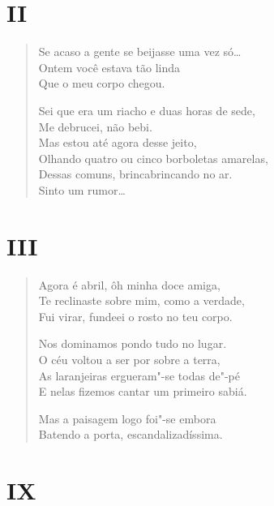 \pagebreak
{}
\section*{II}

\begin{verse}
Se acaso a gente se beijasse uma vez só\ldots{}\\
Ontem você estava tão linda\\
Que o meu corpo chegou.

Sei que era um riacho e duas horas de sede,\\
Me debrucei, não bebi.\\
Mas estou até agora desse jeito,\\
Olhando quatro ou cinco borboletas amarelas,\\
Dessas comuns, brincabrincando no ar.\\
Sinto um rumor\ldots{}
\end{verse}

\pagebreak
{}
\section*{III}

\begin{verse}
Agora é abril, ôh minha doce amiga,\\
Te reclinaste sobre mim, como a verdade,\\
Fui virar, fundeei o rosto no teu corpo.

Nos dominamos pondo tudo no lugar.\\
O céu voltou a ser por sobre a terra,\\
As laranjeiras ergueram"-se todas de"-pé\\
E nelas fizemos cantar um primeiro sabiá.

Mas a paisagem logo foi"-se embora\\
Batendo a porta, escandalizadíssima.
\end{verse}

\pagebreak
{}
\section*{IX}

